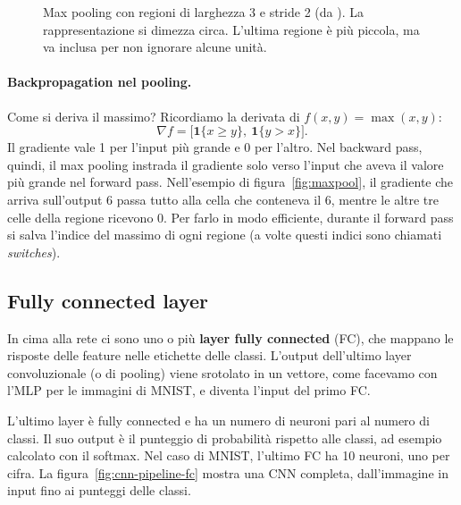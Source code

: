 \begin{figure}[htbp]
\centering
{}
\caption{Max pooling con regioni di larghezza 3 e stride 2 (da \cite{Goodfellow-et-al-2016}). La rappresentazione si dimezza circa. L'ultima regione è più piccola, ma va inclusa per non ignorare alcune unità.}
\label{fig:pool-downsample}
\end{figure}

\paragraph{Backpropagation nel pooling.}
Come si deriva il massimo? Ricordiamo la derivata di $f(x, y) = \max(x, y)$:
\[
\nabla f = \big[\mathbf{1}\{x \ge y\},\ \mathbf{1}\{y > x\}\big].
\]
Il gradiente vale 1 per l'input più grande e 0 per l'altro. Nel backward pass, quindi, il max pooling instrada il gradiente solo verso l'input che aveva il valore più grande nel forward pass. Nell'esempio di figura~\ref{fig:maxpool}, il gradiente che arriva sull'output 6 passa tutto alla cella che conteneva il 6, mentre le altre tre celle della regione ricevono 0. Per farlo in modo efficiente, durante il forward pass si salva l'indice del massimo di ogni regione (a volte questi indici sono chiamati \emph{switches}).

\subsection{Fully connected layer}
In cima alla rete ci sono uno o più \textbf{layer fully connected} (FC), che mappano le risposte delle feature nelle etichette delle classi. L'output dell'ultimo layer convoluzionale (o di pooling) viene srotolato in un vettore, come facevamo con l'MLP per le immagini di MNIST, e diventa l'input del primo FC.

L'ultimo layer è fully connected e ha un numero di neuroni pari al numero di classi. Il suo output è il punteggio di probabilità rispetto alle classi, ad esempio calcolato con il softmax. Nel caso di MNIST, l'ultimo FC ha 10 neuroni, uno per cifra. La figura~\ref{fig:cnn-pipeline-fc} mostra una CNN completa, dall'immagine in input fino ai punteggi delle classi.

